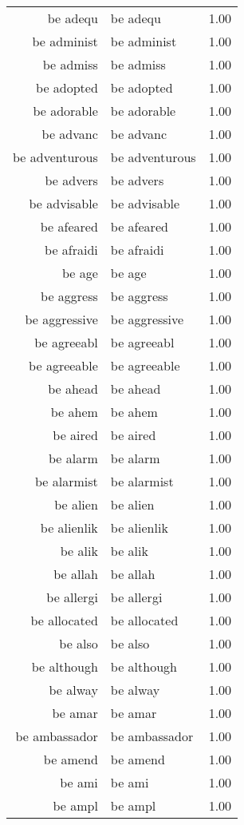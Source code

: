 \begin{table}[ht]
\begin{tabular}{rlr}
  be adequ & be adequ & 1.00 \\ 
  be administ & be administ & 1.00 \\ 
  be admiss & be admiss & 1.00 \\ 
  be adopted & be adopted & 1.00 \\ 
  be adorable & be adorable & 1.00 \\ 
  be advanc & be advanc & 1.00 \\ 
  be adventurous & be adventurous & 1.00 \\ 
  be advers & be advers & 1.00 \\ 
  be advisable & be advisable & 1.00 \\ 
  be afeared & be afeared & 1.00 \\ 
  be afraidi & be afraidi & 1.00 \\ 
  be age & be age & 1.00 \\ 
  be aggress & be aggress & 1.00 \\ 
  be aggressive & be aggressive & 1.00 \\ 
  be agreeabl & be agreeabl & 1.00 \\ 
  be agreeable & be agreeable & 1.00 \\ 
  be ahead & be ahead & 1.00 \\ 
  be ahem & be ahem & 1.00 \\ 
  be aired & be aired & 1.00 \\ 
  be alarm & be alarm & 1.00 \\ 
  be alarmist & be alarmist & 1.00 \\ 
  be alien & be alien & 1.00 \\ 
  be alienlik & be alienlik & 1.00 \\ 
  be alik & be alik & 1.00 \\ 
  be allah & be allah & 1.00 \\ 
  be allergi & be allergi & 1.00 \\ 
  be allocated & be allocated & 1.00 \\ 
  be also & be also & 1.00 \\ 
  be although & be although & 1.00 \\ 
  be alway & be alway & 1.00 \\ 
  be amar & be amar & 1.00 \\ 
  be ambassador & be ambassador & 1.00 \\ 
  be amend & be amend & 1.00 \\ 
  be ami & be ami & 1.00 \\ 
  be ampl & be ampl & 1.00 \\ 

\end{tabular}
\end{table}
